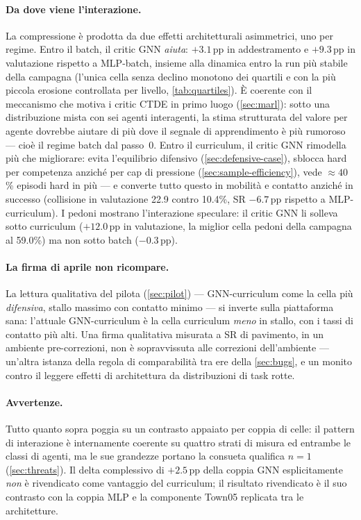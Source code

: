 \paragraph{Da dove viene l'interazione.}
La compressione è prodotta da due effetti architetturali asimmetrici,
uno per regime. Entro il batch, il critic GNN \emph{aiuta}: $+3.1$\,pp
in addestramento e $+9.3$\,pp in valutazione rispetto a MLP-batch,
insieme alla dinamica entro la run più stabile della campagna (l'unica
cella senza declino monotono dei quartili e con la più piccola erosione
controllata per livello, \cref{tab:quartiles}). È coerente con il
meccanismo che motiva i critic CTDE in primo luogo (\cref{sec:marl}):
sotto una distribuzione mista con sei agenti interagenti, la stima
strutturata del valore per agente dovrebbe aiutare di più dove il
segnale di apprendimento è più rumoroso --- cioè il regime batch dal
passo~0. Entro il curriculum, il critic GNN rimodella più che
migliorare: evita l'equilibrio difensivo (\cref{sec:defensive-case}),
sblocca hard per competenza anziché per cap di pressione
(\cref{sec:sample-efficiency}), vede $\approx 40$\% episodi hard in più
--- e converte tutto questo in mobilità e contatto anziché in successo
(collisione in valutazione 22.9 contro 10.4\%, SR $-6.7$\,pp rispetto a
MLP-curriculum). I pedoni mostrano l'interazione speculare: il critic
GNN li solleva sotto curriculum ($+12.0$\,pp in valutazione, la miglior
cella pedoni della campagna al 59.0\%) ma non sotto batch
($-0.3$\,pp).

\paragraph{La firma di aprile non ricompare.}
La lettura qualitativa del pilota (\cref{sec:pilot}) ---
GNN-curriculum come la cella più \emph{difensiva}, stallo massimo con
contatto minimo --- si inverte sulla piattaforma sana: l'attuale
GNN-curriculum è la cella curriculum \emph{meno} in stallo, con i tassi
di contatto più alti. Una firma qualitativa misurata a SR di pavimento,
in un ambiente pre-correzioni, non è sopravvissuta alle correzioni
dell'ambiente --- un'altra istanza della regola di comparabilità tra
ere della \cref{sec:bugs}, e un monito contro il leggere effetti di
architettura da distribuzioni di task rotte.

\paragraph{Avvertenze.}
Tutto quanto sopra poggia su un contrasto appaiato per coppia di celle:
il pattern di interazione è internamente coerente su quattro strati di
misura ed entrambe le classi di agenti, ma le sue grandezze portano la
consueta qualifica $n{=}1$ (\cref{sec:threats}). Il delta complessivo
di $+2.5$\,pp della coppia GNN esplicitamente \emph{non} è rivendicato
come vantaggio del curriculum; il risultato rivendicato è il suo
contrasto con la coppia MLP e la componente Town05 replicata tra le
architetture.

